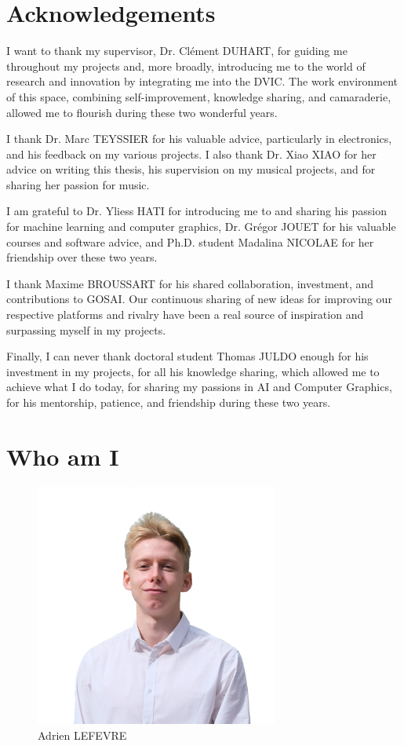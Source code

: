 \section{Acknowledgements}

I want to thank my supervisor, Dr. Clément DUHART, for guiding me throughout my projects and, more broadly, introducing me to the world of research and innovation by integrating me into the DVIC. The work environment of this space, combining self-improvement, knowledge sharing, and camaraderie, allowed me to flourish during these two wonderful years.

I thank Dr. Marc TEYSSIER for his valuable advice, particularly in electronics, and his feedback on my various projects. I also thank Dr. Xiao XIAO for her advice on writing this thesis, his supervision on my musical projects, and for sharing her passion for music.

I am grateful to Dr. Yliess HATI for introducing me to and sharing his passion for machine learning and computer graphics, Dr. Grégor JOUET for his valuable courses and software advice, and Ph.D. student Madalina NICOLAE for her friendship over these two years.

I thank Maxime BROUSSART for his shared collaboration, investment, and contributions to GOSAI. Our continuous sharing of new ideas for improving our respective platforms and rivalry have been a real source of inspiration and surpassing myself in my projects.

Finally, I can never thank doctoral student Thomas JULDO enough for his investment in my projects, for all his knowledge sharing, which allowed me to achieve what I do today, for sharing my passions in AI and Computer Graphics, for his mentorship, patience, and friendship during these two years. 

\newpage

\section{Who am I}

\begin{figure}[h]
    \centering
    \includegraphics[width=8cm]{images/adrien.png}
    \caption{Adrien LEFEVRE}
\end{figure}

